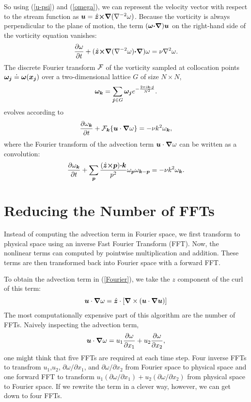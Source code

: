 \documentclass[12pt]{article}
\def\v{\bm}
\def\lap{{\nabla}^2}
\def\lapinv{{\nabla}^{-2}}
\def\vw{{\v\w}}
\def\Eq#1{(\ref{#1})}
\begin{document}
So using \Eq{u-psi} and \Eq{omega}, we can represent the velocity
vector with respect to the stream function as
$\vu=\hat{\vz}\cross\grad(\lapinv\omega)$.
Because the vorticity is always perpendicular to the plane of motion,
the term $(\vw\dot\grad)\vu$ on the right-hand side of the vorticity equation vanishes:
$$\frac{\partial \omega}{\partial t} + (\hat{\vz}\cross\grad(\lapinv\omega)\dot\grad)\omega= \nu\lap\omega .$$
The discrete Fourier transform ${\cal F}$ of the vorticity sampled at collocation
points $\vw_\vj\doteq\vw(\vx_\vj)$ over a two-dimensional lattice
$G$ of size $N\times N$,
$$
\vw_{\vk}=\sum_{\vj\in G} \vw_\vj e^{-\fr{2\pi i\vk\dot\vj}{N^2}}.
$$
evolves according to
\begin{equation}\label{Fourier}
\frac{\partial\omega_{\vk}}{\partial t} + {\cal F}_\vk\{\vu\cdot\grad\omega\}= -\nu k^2\omega_{\vk},
\end{equation}
where the Fourier transform of the advection term
$\vu\cdot\grad\omega$ can be written as a convolution:
\begin{equation}\label{Fourier-expand}
\frac{\partial\omega_{\vk}}{\partial t} + \sum_{\vp}{\frac{(\hat{\vz}\cross\vp)\dot\vk}{p^2}\omega_{\vp}\omega_{\vk-\vp}}= -\nu k^2\omega_{\vk}.
\end{equation}


\section{Reducing the Number of FFTs}
Instead of computing the advection term in Fourier space, we first transform to physical space using an inverse Fast Fourier Transform (FFT). Now, the nonlinear terms can computed by pointwise multiplication and addition. These terms are then transformed back into Fourier space with a forward FFT.

To obtain the advection term in \Eq{Fourier}, we take the $z$ component of the curl of this term:
\begin{equation}
\vu\cdot\grad\omega =\hat{\vz}\cdot \left[\grad \times \left(\vu\cdot\grad\vu \right)\right]
\end{equation}
The most computationally expensive part of this algorithm are the number of FFTs. Naively inspecting the advection term,
\begin{equation}
\vu\cdot\grad\omega = u_1\frac{\partial \omega}{\partial x_1}+u_2\frac{\partial \omega}{\partial x_2},
\end{equation}
one might think that five FFTs are required at each time step. Four inverse FFTs to transfrom $u_1$,$ u_2$, $\partial \omega/\partial x_1$, and $\partial \omega/\partial x_2$ from Fourier space to physical space and one forward FFT to transform $u_1\left(\partial \omega/\partial x_1\right)+u_2\left(\partial \omega/\partial x_2\right)$ from physical space to Fourier space. If we rewrite the term in a clever way, however, we can get down to four FFTs.
\end{document}
